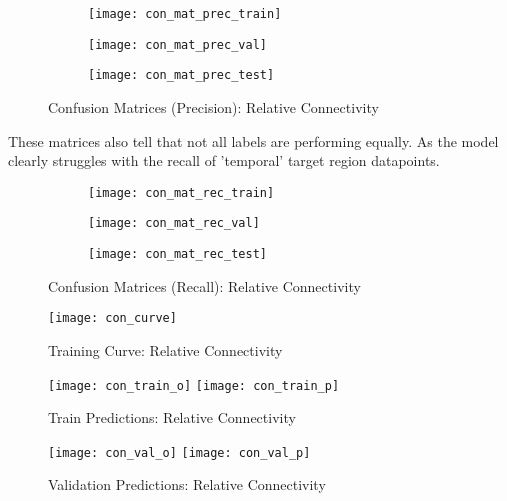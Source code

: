 \begin{figure}[H]
\centering
\begin{subfigure}{0.49\textwidth}
  \centering
  \texttt{[image: con\_mat\_prec\_train]}
\end{subfigure}
\hfill
\begin{subfigure}{0.49\textwidth}
  \centering
  \texttt{[image: con\_mat\_prec\_val]}
\end{subfigure}
\begin{subfigure}{0.49\textwidth}
  \centering
  \texttt{[image: con\_mat\_prec\_test]}
\end{subfigure}
\caption{Confusion Matrices (Precision): Relative Connectivity}
\label{fig:conf_prec}
\end{figure}

These matrices also tell that not all labels are performing equally. As the model clearly struggles with the recall of 'temporal' target region datapoints.

\begin{figure}[H]
\centering
\begin{subfigure}{0.49\textwidth}
  \centering
  \texttt{[image: con\_mat\_rec\_train]}
\end{subfigure}
\hfill
\begin{subfigure}{0.49\textwidth}
  \centering
  \texttt{[image: con\_mat\_rec\_val]}
\end{subfigure}
\begin{subfigure}{0.49\textwidth}
  \centering
  \texttt{[image: con\_mat\_rec\_test]}
\end{subfigure}
\caption{Confusion Matrices (Recall): Relative Connectivity}
\label{fig:conf_rec}
\end{figure}

\begin{figure}[H]
\centering
\texttt{[image: con\_curve]}
\caption{Training Curve: Relative Connectivity}
\label{fig:curve-con}
\end{figure}

\begin{figure}[H]
\centering
\texttt{[image: con\_train\_o]}
\texttt{[image: con\_train\_p]}
\caption{Train Predictions: Relative Connectivity}
\label{fig:pred-tra-con}
\end{figure}

\begin{figure}[H]
\centering
\texttt{[image: con\_val\_o]}
\texttt{[image: con\_val\_p]}
\caption{Validation Predictions: Relative Connectivity}
\label{fig:pred-val-con}
\end{figure}

